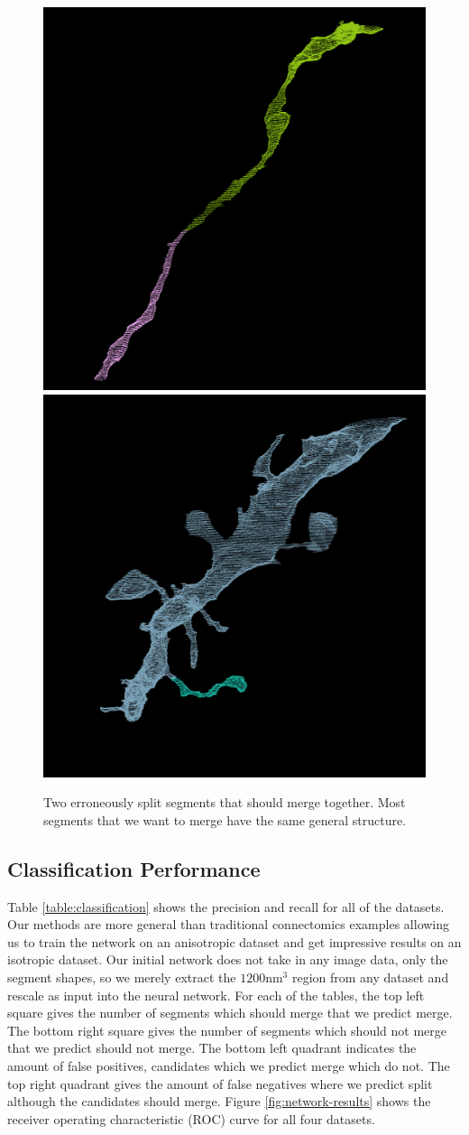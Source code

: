 \begin{figure}[t]
	\centering
	\includegraphics[width=0.42\linewidth]{./figures/merge_candidate1.png}
	\hspace{0.085\linewidth}
	\includegraphics[width=0.42\linewidth]{./figures/merge_candidate2.png}
	\caption{Two erroneously split segments that should merge together. Most segments that we want to merge have the same general structure.}
	\label{fig:skeleton-results}
\end{figure}


\subsection{Classification Performance}

Table \ref{table:classification} shows the precision and recall for all of the datasets. Our methods are more general than traditional connectomics examples allowing us to train the network on an anisotropic dataset and get impressive results on an isotropic dataset. Our initial network does not take in any image data, only the segment shapes, so we merely extract the $1200 \textrm{nm}^3$ region from any dataset and rescale as input into the neural network. For each of the tables, the top left square gives the number of segments which should merge that we predict merge. The bottom right square gives the number of segments which should not merge that we predict should not merge. The bottom left quadrant indicates the amount of false positives, candidates which we predict merge which do not. The top right quadrant gives the amount of false negatives where we predict split although the candidates should merge. Figure \ref{fig:network-results} shows the receiver operating characteristic (ROC) curve for all four datasets. 

